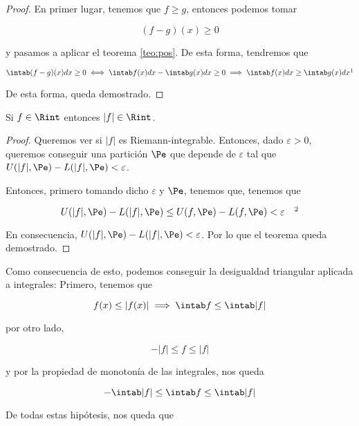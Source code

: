 \begin{proof}
    En primer lugar, tenemos que $f \geq g$, entonces podemos tomar
    
    \[
    (f-g)(x) \geq 0
    \]
    
    \noindent y pasamos a aplicar el teorema \ref{teo:pos}. De esta forma, tendremos que
    
    \[
    \intab (f-g)(x)dx \geq 0 \iff \intab f(x)dx - \intab g(x)dx \geq 0 \implies \intab f(x)dx \geq \intab g(x)dx \footnotemark
    \]
    
    De esta forma, queda demostrado.
\end{proof}

\begin{teo}\label{teo:riemod}
    Si $f \in \Rint$ entonces $|f| \in \Rint$.
\end{teo}

\begin{proof}
    Queremos ver si $|f|$ es Riemann-integrable. Entonces, dado $\varepsilon > 0$, queremos conseguir una partición $\Pe$ que depende de $\varepsilon$ tal que $U(|f|, \Pe) - L(|f|, \Pe) < \varepsilon$.
    
    Entonces, primero tomando dicho $\varepsilon$ y $\Pe$, tenemos que, tenemos que
    
    \[
    U(|f|, \Pe) - L(|f|, \Pe) \leq U(f, \Pe) - L(f, \Pe) < \varepsilon \quad \footnotemark
    \]
    
    En consecuencia, $U(|f|, \Pe) - L(|f|, \Pe) < \varepsilon$. Por lo que el teorema queda demostrado.
\end{proof}

Como consecuencia de esto, podemos conseguir la desigualdad triangular aplicada a integrales: Primero, tenemos que

\[
f(x) \leq |f(x)| \implies \intab f \leq \intab |f|
\]

\noindent por otro lado,

\[
-|f| \leq f \leq |f|
\]

\noindent y por la propiedad de monotonía de las integrales, nos queda

\[
- \intab |f| \leq \intab f \leq \intab |f|
\]

De todas estas hipótesis, nos queda que

